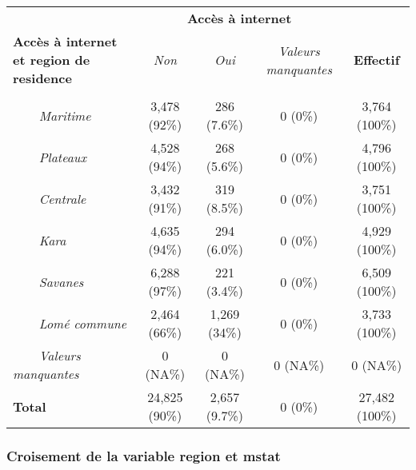 \documentclass[
]{article}
\begin{document}
\begin{table}[!t]
\fontsize{12.0pt}{14.4pt}\selectfont
\begin{tabular*}{\linewidth}{@{\extracolsep{\fill}}lcccc}
\toprule
 & \multicolumn{3}{c}{\textbf{Accès à internet}} &  \\ 
\cmidrule(lr){2-4}
\textbf{Accès à internet et region de residence} & \emph{Non} & \emph{Oui} & \emph{Valeurs manquantes} & \textbf{Effectif} \\ 
\midrule\addlinespace[2.5pt]
{\bfseries Region de residence} &  &  &  &  \\ 
{\itshape     Maritime} & 3,478 (92\%) & 286 (7.6\%) & 0 (0\%) & 3,764 (100\%) \\ 
{\itshape     Plateaux} & 4,528 (94\%) & 268 (5.6\%) & 0 (0\%) & 4,796 (100\%) \\ 
{\itshape     Centrale} & 3,432 (91\%) & 319 (8.5\%) & 0 (0\%) & 3,751 (100\%) \\ 
{\itshape     Kara} & 4,635 (94\%) & 294 (6.0\%) & 0 (0\%) & 4,929 (100\%) \\ 
{\itshape     Savanes} & 6,288 (97\%) & 221 (3.4\%) & 0 (0\%) & 6,509 (100\%) \\ 
{\itshape     Lomé commune} & 2,464 (66\%) & 1,269 (34\%) & 0 (0\%) & 3,733 (100\%) \\ 
{\itshape     Valeurs manquantes} & 0 (NA\%) & 0 (NA\%) & 0 (NA\%) & 0 (NA\%) \\ 
{\bfseries Total} & 24,825 (90\%) & 2,657 (9.7\%) & 0 (0\%) & 27,482 (100\%) \\ 
\bottomrule
\end{tabular*}
\end{table}

\subsubsection{Croisement de la variable region et
mstat}\label{croisement-de-la-variable-region-et-mstat}
\end{document}
